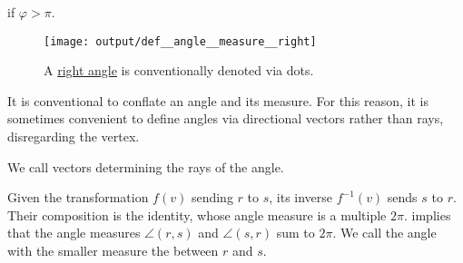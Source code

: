 \begin{definition}
\begin{thmenum}
\begin{thmenum}
      \medspace

        if \( \varphi > \pi \).
    \end{thmenum}

    \begin{figure}[!ht]
      \centering
      \texttt{[image: output/def\_\_angle\_\_measure\_\_right]}
      \caption{A \hyperref[def:angle/measure/right]{right angle} is conventionally denoted via dots.}\label{fig:def:angle/measure/right}
    \end{figure}

     It is conventional to conflate an angle and its measure. For this reason, it is sometimes convenient to define angles via directional vectors rather than rays, disregarding the vertex.

    We call vectors determining the rays  of the angle.

     Given the transformation \( f(v) \) sending \( r \) to \( s \), its inverse \( f^{-1}(v) \) sends \( s \) to \( r \). Their composition is the identity, whose angle measure is a multiple \( 2\pi \).  implies that the angle measures \( \angle(r, s) \) and \( \angle(s, r) \) sum to \( 2\pi \). We call the angle with the smaller measure the  between \( r \) and \( s \).
  \end{thmenum}
\end{definition}

